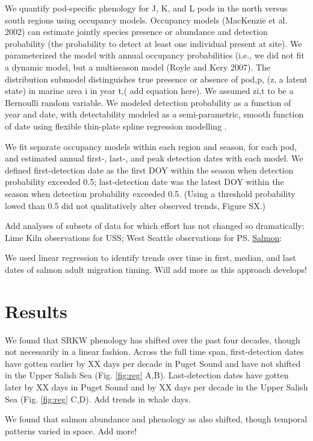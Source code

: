 \documentclass{article}
\begin{document}
\par We quantify pod-specific phenology for J, K, and L pods in the north versus south regions using occupancy models. Occupancy models (MacKenzie et al. 2002) can estimate jointly species presence or abundance and detection probability (the probability to detect at least one individual present at site). We parameterized the model with annual occupancy probabilities (i.e., we did not fit a dynamic model, but a multiseason model (Royle and Kery 2007). The distribution submodel distinguishes true presence or absence of pod,p, (z, a latent state) in marine area i in year t,( add equation here). We assumed zi,t to be a Bernoulli random variable. We modeled detection probability as a function of year and date, with detectability modeled as a semi-parametric, smooth function of date using flexible thin-plate spline regression modelling \citep{strebel2014}. 
\par  We fit separate occupancy models within each region and season, for each pod, and estimated annual first-, last-, and peak detection dates with each model. We defined first-detection date as the first DOY within the season when detection probability exceeded 0.5; last-detection date was the latest DOY within the season when detection probability exceeded 0.5. (Using a threshold probability lowed than 0.5 did not qualitatively alter observed trends, Figure SX.)
\par Add analyses of subsets of data for which effort has not changed so dramatically: Lime Kiln observations for USS; West Seattle observations for PS.
\underline{Salmon}:
\par We used linear regression to identify trends over time in first, median, and last dates of salmon adult migration timing. Will add more as this approach develops!

\section*{Results}
\par We found that SRKW phenology has shifted over the past four decades, though not necessarily in a linear fashion. Across the full time span, first-detection dates have gotten earlier by XX days per decade in Puget Sound and have not shifted in the Upper Salish Sea (Fig. \ref{fig:reg} A,B). 
Last-detection dates have gotten later by XX days in Puget Sound and by XX days per decade in the Upper Salish Sea (Fig. \ref{fig:reg} C,D). Add trends in whale days. %
\par We found that salmon abundance and phenology as also shifted, though temporal patterns varied in space. Add more!
\end{document}
